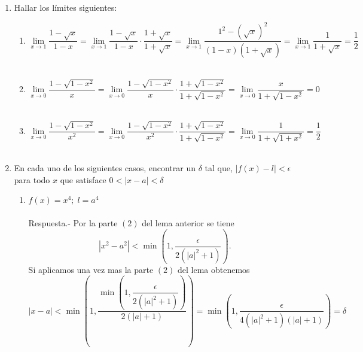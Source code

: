 \begin{enumerate}
\begin{enumerate}[\bfseries (i)]
\end{enumerate}

\item Hallar los límites siguientes:
\begin{enumerate}[\bfseries (i)]
    
    \item $\lim\limits_{x \to 1} \dfrac{1-\sqrt{x}}{1-x} =\lim\limits_{x \to 1} \dfrac{1-\sqrt{x}}{1-x}\cdot \dfrac{1+\sqrt{x}}{1+\sqrt{x}} =\lim\limits_{x \to 1} \dfrac{1^2 - (\sqrt{x})^2}{(1-x)(1+\sqrt{x})} =\lim\limits_{x \to 1} \dfrac{1}{1+\sqrt{x}} = \dfrac{1}{2}$\\\\
    
    \item $\lim\limits_{x \to 0} \dfrac{1-\sqrt{1-x^2}}{x} =\lim\limits_{x \to 0} \dfrac{1-\sqrt{1-x^2}}{x} \cdot \dfrac{1+\sqrt{1-x^2}}{1+\sqrt{1-x^2}} =\lim\limits_{x \to 0} \dfrac{x}{1+\sqrt{1-x^2}} = 0$\\\\
    
    \item $\lim\limits_{x \to 0} \dfrac{1-\sqrt{1-x^2}}{x^2} = \lim\limits_{x \to 0} \dfrac{1-\sqrt{1-x^2}}{x^2}\cdot \dfrac{1+\sqrt{1-x^2}}{1+\sqrt{1-x^2}} = \lim\limits_{x \to 0} \dfrac{1}{1+\sqrt{1+x^2}} = \dfrac{1}{2}$\\\\

\end{enumerate}

\item En cada uno de los siguientes casos, encontrar un $\delta$ tal que, $|f(x)-l|<\epsilon$ para todo $x$ que satisface $0<|x-a|<\delta$\\
\begin{enumerate}[\bfseries (i)]

    \item $f(x)=x^4; \; l=a^4$\\\\
	Respuesta.-\; Por la parte $(2)$ del lema anterior se tiene $$|x^2-a^2| < \min\left(1,\dfrac{\epsilon}{2(|a|^2+1)}\right).$$ Si aplicamos una vez mas la parte $(2)$ del lema obtenemos $$|x-a|<\min\left(1,\dfrac{\min\left(1,\dfrac{\epsilon}{2(|a|^2+1)}\right)}{2(|a|+1)}\right)=\min \left(1,\dfrac{\epsilon}{4(|a|^2 + 1)(|a|+1)}\right)=\delta$$\\


\end{enumerate}
\end{enumerate}
